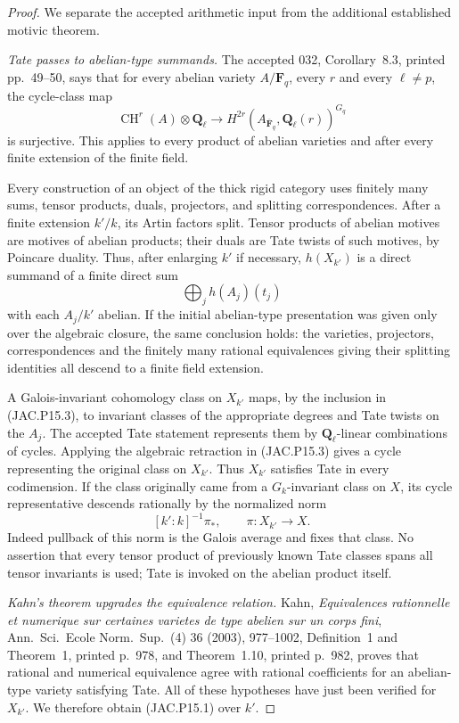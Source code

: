 \begin{proof}
We separate the accepted arithmetic input from the additional
established motivic theorem.

\emph{Tate passes to abelian-type summands.}
The accepted 032, Corollary~8.3, printed pp.~49--50, says that for every abelian variety
$A/\mathbf F_q$, every $r$ and every $\ell\ne p$, the cycle-class
map
\[
 \operatorname{CH}^r(A)\otimes\mathbf Q_\ell
   \longrightarrow H^{2r}(A_{\overline{\mathbf F}_q},
                         \mathbf Q_\ell(r))^{G_q}
\]
is surjective. This applies to every product of abelian varieties
and after every finite extension of the finite field.

Every construction of an object of the thick rigid category uses
finitely many sums, tensor products, duals, projectors, and splitting
correspondences. After a finite extension $k'/k$, its Artin factors
split. Tensor products of abelian motives are motives of abelian
products; their duals are Tate twists of such motives, by Poincare
duality. Thus, after enlarging $k'$ if necessary, $h(X_{k'})$ is
a direct summand of a finite direct sum
\[
              \bigoplus_j h(A_j)(t_j)                    \tag{JAC.P15.3}
\]
with each $A_j/k'$ abelian. If the initial abelian-type presentation
was given only over the algebraic closure, the same conclusion
holds: the varieties, projectors, correspondences and the finitely
many rational equivalences giving their splitting identities all
descend to a finite field extension.

A Galois-invariant cohomology class on $X_{k'}$ maps, by the
inclusion in (JAC.P15.3), to invariant classes of the appropriate
degrees and Tate twists on the $A_j$. The accepted Tate statement
represents them by $\mathbf Q_\ell$-linear combinations of cycles.
Applying the algebraic retraction in (JAC.P15.3) gives a cycle
representing the original class on $X_{k'}$. Thus $X_{k'}$ satisfies
Tate in every codimension. If the class originally came from a
$G_k$-invariant class on $X$, its cycle representative descends
rationally by the normalized norm
\[
           [k':k]^{-1}\pi_*,\qquad \pi:X_{k'}\to X.
\]
Indeed pullback of this norm is the Galois average and fixes that
class. No assertion that every tensor product of previously known
Tate classes spans all tensor invariants is used; Tate is invoked
on the abelian product itself.

\emph{Kahn's theorem upgrades the equivalence relation.}
Kahn, \emph{Equivalences rationnelle et numerique sur certaines
varietes de type abelien sur un corps fini}, Ann.\ Sci.\ Ecole
Norm.\ Sup.\ (4) 36 (2003), 977--1002, Definition~1 and Theorem~1,
printed p.~978, and Theorem~1.10, printed p.~982, proves that
rational and numerical equivalence agree with rational
coefficients for an abelian-type variety satisfying Tate.
All of these hypotheses have just been verified for $X_{k'}$.
We therefore obtain (JAC.P15.1) over $k'$.


\end{proof}
